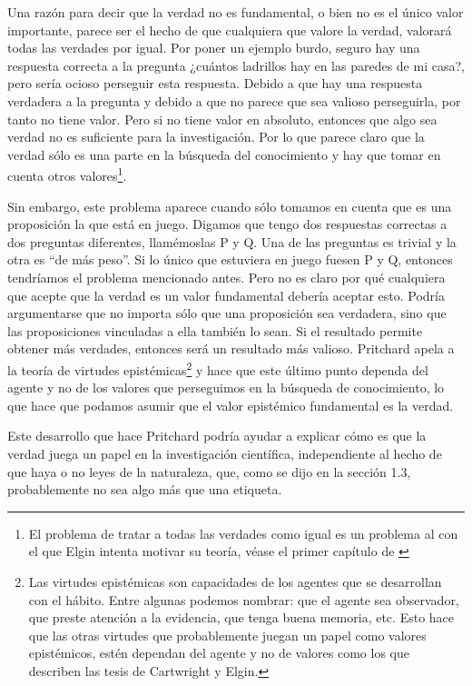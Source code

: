 Una razón para decir que la verdad no es fundamental, o bien no es el único valor importante, parece ser el hecho de que cualquiera que valore la verdad, valorará todas las verdades por igual. Por poner un ejemplo burdo, seguro hay una respuesta correcta a la pregunta ¿cuántos ladrillos hay en las paredes de mi casa?, pero sería ocioso perseguir esta respuesta. Debido a que hay una respuesta verdadera a la pregunta y debido a que no parece que sea valioso perseguirla, por tanto no tiene valor. Pero si no tiene valor en absoluto, entonces que algo sea verdad no es suficiente para la investigación. Por lo que parece claro que la verdad sólo es una parte en la búsqueda del conocimiento y hay que tomar en cuenta otros valores\footnote{El problema de tratar a todas las verdades como igual es un problema al con el que Elgin intenta motivar su teoría, véase el primer capítulo de \cite{Elgin2017}}.

Sin embargo, este problema aparece cuando sólo tomamos en cuenta que es una proposición la que está en juego. Digamos que tengo dos respuestas correctas a dos preguntas diferentes, llamémoslas P y Q. Una de las preguntas es trivial y la otra es ``de más peso''. Si lo único que estuviera en juego fuesen P y Q, entonces tendríamos el problema mencionado antes. Pero no es claro por qué cualquiera que acepte que la verdad es un valor fundamental debería aceptar esto. Podría argumentarse que no importa sólo que una proposición sea verdadera, sino que las proposiciones vinculadas a ella también lo sean. Si el resultado permite obtener más verdades, entonces será un resultado más valioso. Pritchard apela a la teoría de virtudes epistémicas\footnote{Las virtudes epistémicas son capacidades de los agentes que se desarrollan con el hábito. Entre algunas podemos nombrar: que el agente sea observador, que preste atención a la evidencia, que tenga buena memoria, etc. Esto hace que las otras virtudes que probablemente juegan un papel como valores epistémicos, estén dependan del agente y no de valores como los que describen las tesis de Cartwright y Elgin.} y hace que este último punto dependa del agente y no de los valores que perseguimos en la búsqueda de conocimiento, lo que hace que podamos asumir que el valor epistémico fundamental es la verdad.

Este desarrollo que hace Pritchard podría ayudar a explicar cómo es que la verdad juega un papel en la investigación científica, independiente al hecho de que haya o no leyes de la naturaleza, que, como se dijo en la sección 1.3, probablemente no sea algo más que una etiqueta.



